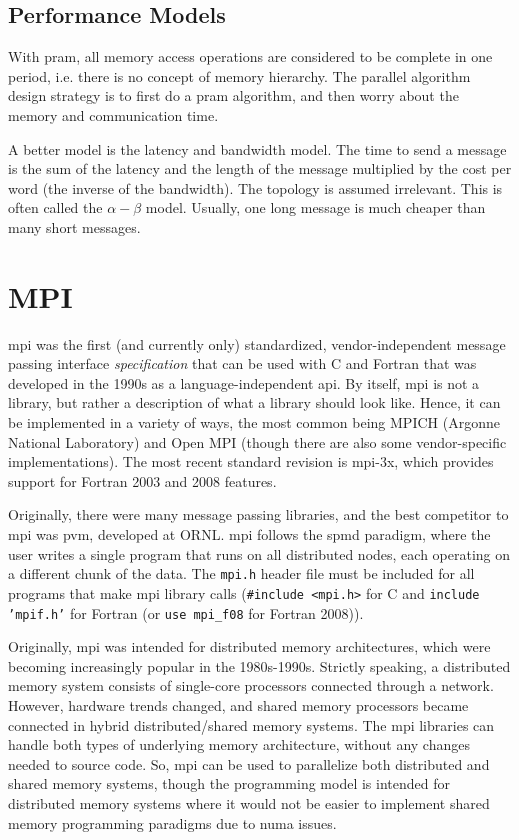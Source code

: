 \documentclass[10pt]{article}
\begin{document}
\begin{flushleft}
\subsection{Performance Models}

With \gls{pram}, all memory access operations are considered to be complete in one period, i.e. there is no concept of memory hierarchy. The parallel algorithm design strategy is to first do a \gls{pram} algorithm, and then worry about the memory and communication time. 

A better model is the latency and bandwidth model. The time to send a message is the sum of the latency and the length of the message multiplied by the cost per word (the inverse of the bandwidth). The topology is assumed irrelevant. This is often called the \(\alpha-\beta\) model. Usually, one long message is much cheaper than many short messages. 

\section{MPI}

\gls{mpi} was the first (and currently only) standardized, vendor-independent message passing interface {\it specification} that can be used with C and Fortran that was developed in the 1990s as a language-independent \gls{api}. By itself, \gls{mpi} is not a library, but rather a description of what a library should look like. Hence, it can be implemented in a variety of ways, the most common being MPICH (Argonne National Laboratory) and Open MPI (though there are also some vendor-specific implementations). The most recent standard revision is \gls{mpi}-3x, which provides support for Fortran 2003 and 2008 features.

Originally, there were many message passing libraries, and the best competitor to \gls{mpi} was \gls{pvm}, developed at ORNL. \gls{mpi} follows the \gls{spmd} paradigm, where the user writes a single program that runs on all distributed nodes, each operating on a different chunk of the data. The {\tt mpi.h} header file must be included for all programs that make \gls{mpi} library calls ({\tt \#include <mpi.h>} for C and {\tt include 'mpif.h'} for Fortran (or {\tt use mpi\_f08} for Fortran 2008)).

Originally, \gls{mpi} was intended for distributed memory architectures, which were becoming increasingly popular in the 1980s-1990s. Strictly speaking, a distributed memory system consists of single-core processors connected through a network. However, hardware trends changed, and shared memory processors became connected in hybrid distributed/shared memory systems. The \gls{mpi} libraries can handle both types of underlying memory architecture, without any changes needed to source code. So, \gls{mpi} can be used to parallelize both distributed and shared memory systems, though the programming model is intended for distributed memory systems where it would not be easier to implement shared memory programming paradigms due to \gls{numa} issues. 


\end{flushleft}
\end{document}
